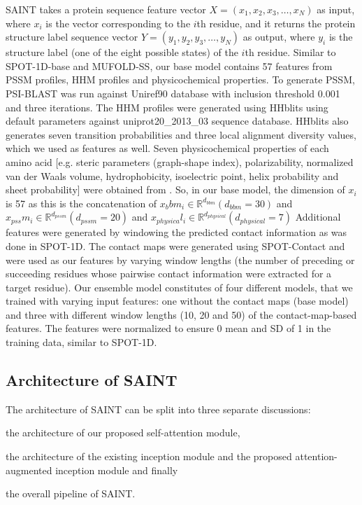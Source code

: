 \documentclass[8pt]{article}
\begin{document}
\begin{multicols}{2}
SAINT takes a protein sequence feature vector  $ X = (x_1, x_2, x_3, \dots , x_N)$ as input, where $x_i$ is the vector corresponding to
the $i$th residue, and it returns the protein structure label sequence
vector $Y =  (y_1, y_2, y_3, \dots , y_N) $ as output, where $y_i$ is the structure
label (one of the eight possible states) of the $i$th residue. Similar to
SPOT-1D-base and MUFOLD-SS, our base model contains 57 features from PSSM profiles, HHM profiles and physicochemical properties. To generate PSSM, PSI-BLAST \citet{altschul1997gapped} was run
against Uniref90 database \citet{uniprot2007universal} with inclusion threshold 0.001 and three iterations. The HHM profiles were
generated using HHblits \citet{remmert2012hhblits} using default
parameters against uniprot20\_2013\_03 sequence database. HHblits
also generates seven transition probabilities and three local alignment diversity values, which we used as features as well. Seven physicochemical properties of each amino acid [e.g. steric parameters
(graph-shape index), polarizability, normalized van der Waals volume, hydrophobicity, isoelectric point, helix probability and sheet
probability] were obtained from \citet{meiler2001generation} . So, in our base
model, the dimension of $x_i$ is 57 as this is the concatenation of
$ x_b b m_i \in  \mathbb{R}^{d_{bbm}} (d_{bbm} = 30) $ and $ x_{pss} m_i \in  \mathbb{R}^{d_{pssm}} (d_{pssm} = 20) $ and  $ x_{physica} l_i \in  \mathbb{R}^{d_{physical}} (d_{physical} = 7) $ Additional features were generated
by windowing the predicted contact information as was done in
SPOT-1D. The contact maps were generated using SPOT-Contact
\citet{hanson2018accurate} and were used as our features by varying window lengths (the number of preceding or succeeding residues whose
pairwise contact information were extracted for a target residue).
Our ensemble model constitutes of four different models, that we
trained with varying input features: one without the contact maps
(base model) and three with different window lengths (10, 20 and
50) of the contact-map-based features. The features were normalized to ensure 0 mean and SD of 1 in the training data, similar to
SPOT-1D.

\subsection{Architecture of SAINT}

The architecture of SAINT can be split into three separate discussions:

\begin{enumerate*}[label=(\roman*)]
\item { the architecture of our proposed self-attention module,}
\item { the architecture of the existing inception module and the proposed
attention-augmented inception module and finally}
\item { the overall
pipeline of SAINT.}
\end{enumerate*}



\end{multicols}
\end{document}
